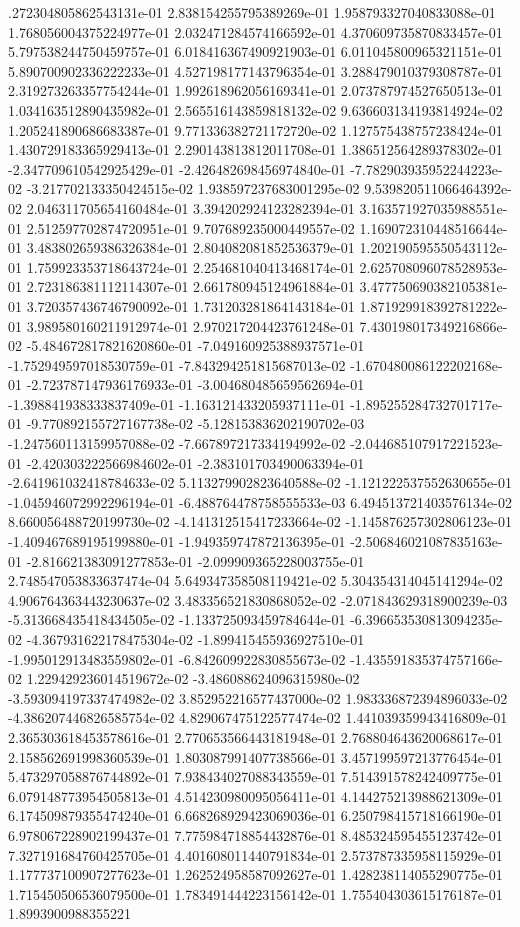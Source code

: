 .272304805862543131e-01	2.838154255795389269e-01	1.958793327040833088e-01	1.768056004375224977e-01	2.032471284574166592e-01	4.370609735870833457e-01	5.797538244750459757e-01	6.018416367490921903e-01	6.011045800965321151e-01	5.890700902336222233e-01	4.527198177143796354e-01	3.288479010379308787e-01	2.319273263357754244e-01	1.992618962056169341e-01	2.073787974527650513e-01	1.034163512890435982e-01	2.565516143859818132e-02	9.636603134193814924e-02	1.205241890686683387e-01	9.771336382721172720e-02	1.127575438757238424e-01	1.430729183365929413e-01	2.290143813812011708e-01	1.386512564289378302e-01	-2.347709610542925429e-01	-2.426482698456974840e-01	-7.782903935952244223e-02	-3.217702133350424515e-02	1.938597237683001295e-02	9.539820511066464392e-02	2.046311705654160484e-01	3.394202924123282394e-01	3.163571927035988551e-01	2.512597702874720951e-01	9.707689235000449557e-02	1.169072310448516644e-01	3.483802659386326384e-01	2.804082081852536379e-01	1.202190595550543112e-01	1.759923353718643724e-01	2.254681040413468174e-01	2.625708096078528953e-01	2.723186381112114307e-01	2.661780945124961884e-01	3.477750690382105381e-01	3.720357436746790092e-01	1.731203281864143184e-01	1.871929918392781222e-01	3.989580160211912974e-01	2.970217204423761248e-01	7.430198017349216866e-02	-5.484672817821620860e-01	-7.049160925388937571e-01	-1.752949597018530759e-01	-7.843294251815687013e-02	-1.670480086122202168e-01	-2.723787147936176933e-01	-3.004680485659562694e-01	-1.398841938333837409e-01	-1.163121433205937111e-01	-1.895255284732701717e-01	-9.770892155727167738e-02	-5.128153836202190702e-03	-1.247560113159957088e-02	-7.667897217334194992e-02	-2.044685107917221523e-01	-2.420303222566984602e-01	-2.383101703490063394e-01	-2.641961032418784633e-02	5.113279902823640588e-02	-1.121222537552630655e-01	-1.045946072992296194e-01	-6.488764478758555533e-03	6.494513721403576134e-02	8.660056488720199730e-02	-4.141312515417233664e-02	-1.145876257302806123e-01	-1.409467689195199880e-01	-1.949359747872136395e-01	-2.506846021087835163e-01	-2.816621383091277853e-01	-2.099909365228003755e-01	2.748547053833637474e-04	5.649347358508119421e-02	5.304354314045141294e-02	4.906764363443230637e-02	3.483356521830868052e-02	-2.071843629318900239e-03	-5.313668435418434505e-02	-1.133725093459784644e-01	-6.396653530813094235e-02	-4.367931622178475304e-02	-1.899415455936927510e-01	-1.995012913483559802e-01	-6.842609922830855673e-02	-1.435591835374757166e-02	1.229429236014519672e-02	-3.486088624096315980e-02	-3.593094197337474982e-02	3.852952216577437000e-02	1.983336872394896033e-02	-4.386207446826585754e-02	4.829067475122577474e-02	1.441039359943416809e-01	2.365303618453578616e-01	2.770653566443181948e-01	2.768804643620068617e-01	2.158562691998360539e-01	1.803087991407738566e-01	3.457199597213776454e-01	5.473297058876744892e-01	7.938434027088343559e-01	7.514391578242409775e-01	6.079148773954505813e-01	4.514230980095056411e-01	4.144275213988621309e-01	6.174509879355474240e-01	6.668268929423069036e-01	6.250798415718166190e-01	6.978067228902199437e-01	7.775984718854432876e-01	8.485324595455123742e-01	7.327191684760425705e-01	4.401608011440791834e-01	2.573787335958115929e-01	1.177737100907277623e-01	1.262524958587092627e-01	1.428238114055290775e-01	1.715450506536079500e-01	1.783491444223156142e-01	1.755404303615176187e-01	1.8993900988355221